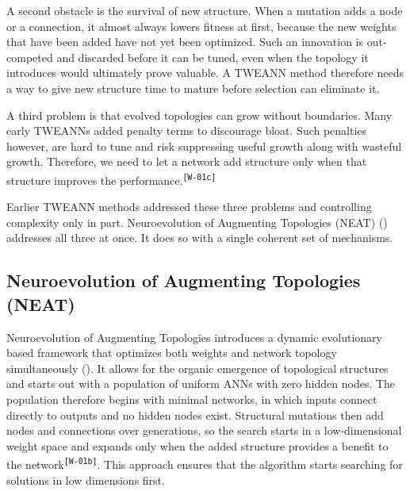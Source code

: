 \documentclass[12pt]{article}
\newcommand{\revID}[1]{\textsuperscript{\scriptsize\texttt{[#1]}}}
\newcommand{\revWrong}[2]{\textcolor{revRed}{#2}\revID{#1}}
\begin{document}
A second obstacle is the survival of new structure.
When a mutation adds a node or a connection, it almost always lowers fitness at first, because the new weights that have been added have not yet been optimized.
Such an innovation is out-competed and discarded before it can be tuned, even when the topology it introduces would ultimately prove valuable.
A TWEANN method therefore needs a way to give new structure time to mature before selection can eliminate it.

A third problem is that evolved topologies can grow without boundaries.
Many early TWEANNs added penalty terms to discourage bloat.
Such penalties however, are hard to tune and risk suppressing useful growth along with wasteful growth.
\revWrong{W-01c}{Therefore, we need to let a network add structure only when that structure improves the performance.}

Earlier TWEANN methods addressed these three problems and controlling complexity only in part.
Neuroevolution of Augmenting Topologies (NEAT) (\cite{stanley_evolving_2002}) addresses all three at once.
It does so with a single coherent set of mechanisms.


\subsection{Neuroevolution of Augmenting Topologies (NEAT)}
\label{subsec:neuroevolution-of-augmenting-topologies-neat}


Neuroevolution of Augmenting Topologies introduces a dynamic evolutionary based framework that optimizes both weights and network topology simultaneously (\cite{stanley_evolving_2002}).
It allows for the organic emergence of topological structures and starts out with a population of uniform ANNs with zero hidden nodes.
The population therefore begins with minimal networks, in which inputs connect directly to outputs and no hidden nodes exist.
Structural mutations then add nodes and connections over generations, so the search starts in a low-dimensional weight space and \revWrong{W-01b}{expands only when the added structure provides a benefit to the network}.
This approach ensures that the algorithm starts searching for solutions in low dimensions first.
\end{document}
